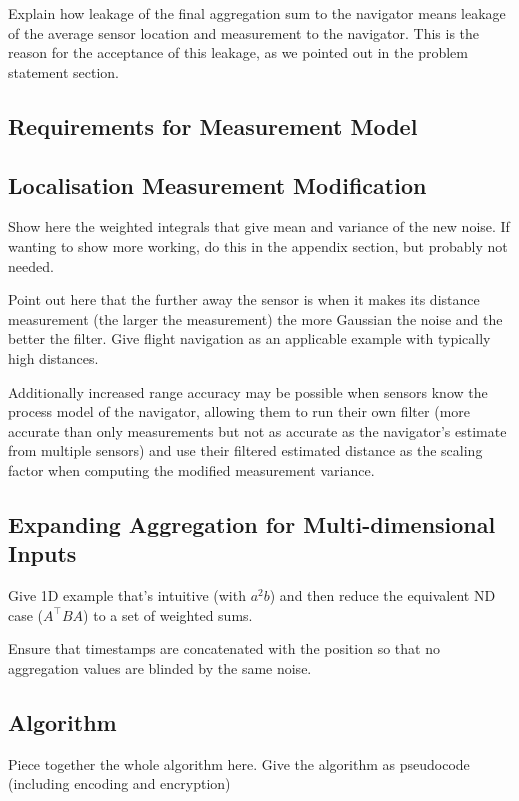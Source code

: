 \documentclass[twocolumn]{autart}
\theoremstyle{definition}
\begin{document}
Explain how leakage of the final aggregation sum to the navigator means leakage of the average sensor location and measurement to the navigator. This is the reason for the acceptance of this leakage, as we pointed out in the problem statement section.

\subsection{Requirements for Measurement Model}

\subsection{Localisation Measurement Modification}
Show here the weighted integrals that give mean and variance of the new noise. If wanting to show more working, do this in the appendix section, but probably not needed.

Point out here that the further away the sensor is when it makes its distance measurement (the larger the measurement) the more Gaussian the noise and the better the filter. Give flight navigation as an applicable example with typically high distances.

Additionally increased range accuracy may be possible when sensors know the process model of the navigator, allowing them to run their own filter (more accurate than only measurements but not as accurate as the navigator's estimate from multiple sensors) and use their filtered estimated distance as the scaling factor when computing the modified measurement variance.

\subsection{Expanding Aggregation for Multi-dimensional Inputs}
Give 1D example that's intuitive (with $a^2b$) and then reduce the equivalent ND case ($A^\top BA$) to a set of weighted sums.

Ensure that timestamps are concatenated with the position so that no aggregation values are blinded by the same noise.

\subsection{Algorithm}
Piece together the whole algorithm here.
Give the algorithm as pseudocode (including encoding and encryption)
\end{document}
